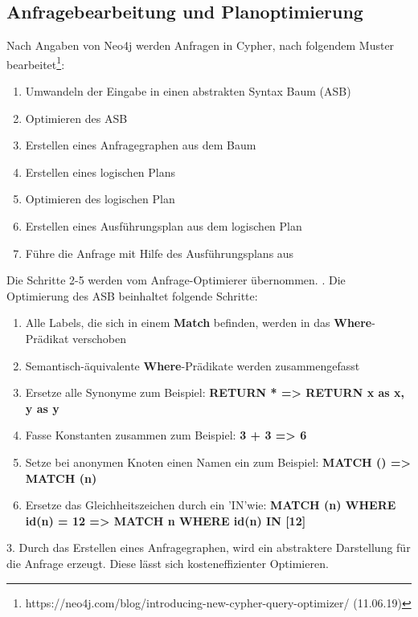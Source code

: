 \subsection{Anfragebearbeitung und Planoptimierung}
Nach Angaben von Neo4j werden Anfragen in Cypher, nach folgendem Muster bearbeitet\footnote{https://neo4j.com/blog/introducing-new-cypher-query-optimizer/  (11.06.19)}:
\begin{enumerate}
	\item Umwandeln der Eingabe in einen abstrakten Syntax Baum (ASB)
	\item Optimieren des ASB
	\item Erstellen eines Anfragegraphen aus dem Baum
	\item Erstellen eines logischen Plans
	\item Optimieren des logischen Plan 
	\item Erstellen eines Ausführungsplan aus dem logischen Plan
	\item Führe die Anfrage mit Hilfe des Ausführungsplans aus 
\end{enumerate}
Die Schritte 2-5 werden vom Anfrage-Optimierer übernommen. \newline
{}. Die Optimierung des ASB beinhaltet folgende Schritte: 
\begin{enumerate}
	\item Alle Labels, die sich in einem \textbf{Match} befinden, werden in das \textbf{Where}-Prädikat verschoben
	\item  Semantisch-äquivalente \textbf{Where}-Prädikate werden zusammengefasst
	\item Ersetze alle Synonyme zum Beispiel: \textbf{RETURN * => RETURN x as x, y as y}
	\item Fasse Konstanten zusammen zum Beispiel: \textbf{3 + 3 => 6}
	\item Setze bei anonymen Knoten einen Namen ein zum Beispiel: \textbf{ MATCH () => MATCH (n)}
	\item Ersetze das Gleichheitszeichen durch ein 'IN'wie: \textbf{MATCH (n) WHERE id(n) = 12 => MATCH n WHERE id(n) IN [12]}
\end{enumerate}
3. Durch das Erstellen eines Anfragegraphen, wird ein abstraktere Darstellung für die Anfrage erzeugt. Diese lässt sich kosteneffizienter Optimieren.	 \newline \newline
